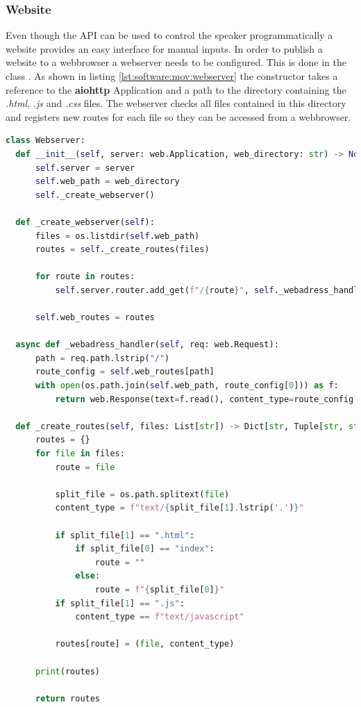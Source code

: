 \subsubsection*{Website}

Even though the API can be used to control the speaker programmatically a website provides an easy interface for manual inputs.\p
%
In order to publish a website to a webbrowser a webserver needs to be configured. This is done in the class . As shown in listing \ref{lst:software:mov:webserver} the constructor takes a reference to the \textbf{aiohttp} Application and a path to the directory containing the \textit{.html}, \textit{.js} and \textit{.css} files. The webserver checks all files contained in this directory and registers new routes for each file so they can be accessed from a webbrowser.\p
%
\begin{mdframed}
\begin{lstlisting}[language=Python, caption=Minimal python webserver, label=lst:software:mov:webserver]
class Webserver:
  def __init__(self, server: web.Application, web_directory: str) -> None:
      self.server = server
      self.web_path = web_directory
      self._create_webserver()

  def _create_webserver(self):
      files = os.listdir(self.web_path)
      routes = self._create_routes(files)

      for route in routes:
          self.server.router.add_get(f"/{route}", self._webadress_handler)

      self.web_routes = routes

  async def _webadress_handler(self, req: web.Request):
      path = req.path.lstrip("/")
      route_config = self.web_routes[path]
      with open(os.path.join(self.web_path, route_config[0])) as f:
          return web.Response(text=f.read(), content_type=route_config[1])

  def _create_routes(self, files: List[str]) -> Dict[str, Tuple[str, str]]:
      routes = {}
      for file in files:
          route = file

          split_file = os.path.splitext(file)
          content_type = f"text/{split_file[1].lstrip('.')}"

          if split_file[1] == ".html":
              if split_file[0] == "index":
                  route = ""
              else:
                  route = f"{split_file[0]}"
          if split_file[1] == ".js":
              content_type == f"text/javascript"

          routes[route] = (file, content_type)

      print(routes)

      return routes
\end{lstlisting}
\end{mdframed}
